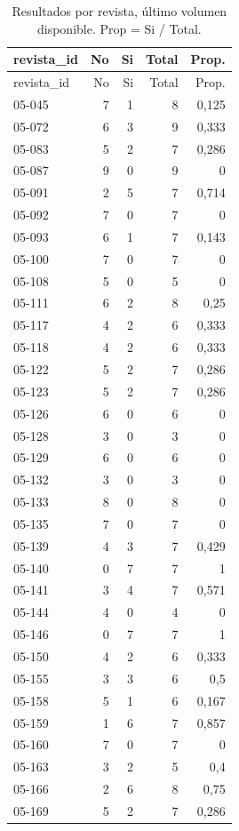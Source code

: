 \begingroup\small
\begin{longtable}{lrrrr}
\caption{Resultados por revista, último volumen disponible. Prop = Si / Total.}\label{tab:por_revista}\\
\toprule
revista\_id & No & Si & Total & Prop.\\
\midrule
\endfirsthead
\toprule
revista\_id & No & Si & Total & Prop.\\
\midrule
\endhead
05-045 & 7 & 1 & 8 & 0,125\\
05-072 & 6 & 3 & 9 & 0,333\\
05-083 & 5 & 2 & 7 & 0,286\\
05-087 & 9 & 0 & 9 & 0\\
05-091 & 2 & 5 & 7 & 0,714\\
05-092 & 7 & 0 & 7 & 0\\
05-093 & 6 & 1 & 7 & 0,143\\
05-100 & 7 & 0 & 7 & 0\\
05-108 & 5 & 0 & 5 & 0\\
05-111 & 6 & 2 & 8 & 0,25\\
05-117 & 4 & 2 & 6 & 0,333\\
05-118 & 4 & 2 & 6 & 0,333\\
05-122 & 5 & 2 & 7 & 0,286\\
05-123 & 5 & 2 & 7 & 0,286\\
05-126 & 6 & 0 & 6 & 0\\
05-128 & 3 & 0 & 3 & 0\\
05-129 & 6 & 0 & 6 & 0\\
05-132 & 3 & 0 & 3 & 0\\
05-133 & 8 & 0 & 8 & 0\\
05-135 & 7 & 0 & 7 & 0\\
05-139 & 4 & 3 & 7 & 0,429\\
05-140 & 0 & 7 & 7 & 1\\
05-141 & 3 & 4 & 7 & 0,571\\
05-144 & 4 & 0 & 4 & 0\\
05-146 & 0 & 7 & 7 & 1\\
05-150 & 4 & 2 & 6 & 0,333\\
05-155 & 3 & 3 & 6 & 0,5\\
05-158 & 5 & 1 & 6 & 0,167\\
05-159 & 1 & 6 & 7 & 0,857\\
05-160 & 7 & 0 & 7 & 0\\
05-163 & 3 & 2 & 5 & 0,4\\
05-166 & 2 & 6 & 8 & 0,75\\
05-169 & 5 & 2 & 7 & 0,286\\

\end{longtable}

